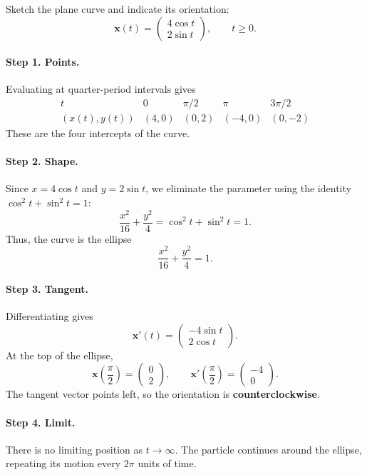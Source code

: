 \documentclass[11pt,letterpaper]{article}
\begin{document}
\begin{example}[6]{
Sketch the plane curve and indicate its orientation:
\[
\mathbf{x}(t)=
\begin{pmatrix}
4\cos t\\
2\sin t
\end{pmatrix},
\qquad t\ge0.
\]
}

\paragraph{Step 1. Points.}
Evaluating at quarter-period intervals gives
\[
\begin{array}{c|cccc}
t & 0 & \pi/2 & \pi & 3\pi/2\\
\hline
(x(t),y(t)) & (4,0) & (0,2) & (-4,0) & (0,-2)
\end{array}
\]
These are the four intercepts of the curve.

\paragraph{Step 2. Shape.}
Since $x=4\cos t$ and $y=2\sin t$, we eliminate
the parameter using the identity
$\cos^2t+\sin^2t=1$:
\[
\frac{x^2}{16}+\frac{y^2}{4}
=\cos^2t+\sin^2t=1.
\]
Thus, the curve is the ellipse
\[
\boxed{\frac{x^2}{16}+\frac{y^2}{4}=1.}
\]

\paragraph{Step 3. Tangent.}
Differentiating gives
\[
\mathbf{x}'(t)=
\begin{pmatrix}
-4\sin t\\
2\cos t
\end{pmatrix}.
\]
At the top of the ellipse,
\[
\mathbf{x}\left(\frac{\pi}{2}\right)
=\begin{pmatrix}0\\2\end{pmatrix},
\qquad
\mathbf{x}'\left(\frac{\pi}{2}\right)
=\begin{pmatrix}-4\\0\end{pmatrix}.
\]
The tangent vector points left, so the orientation
is \textbf{counterclockwise}.

\paragraph{Step 4. Limit.}
There is no limiting position as $t\to\infty$.
The particle continues around the ellipse,
repeating its motion every $2\pi$ units of time.


\end{example}
\end{document}
